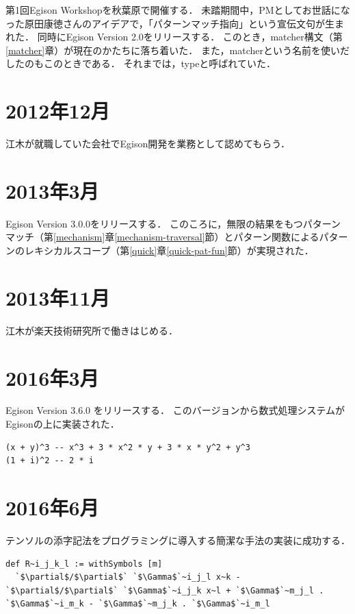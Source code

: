 第1回Egison Workshopを秋葉原で開催する．
未踏期間中，PMとしてお世話になった原田康徳さんのアイデアで，「パターンマッチ指向」という宣伝文句が生まれた．
同時にEgison Version 2.0をリリースする．
このとき，matcher構文（第\ref{matcher}章）が現在のかたちに落ち着いた．
また，matcherという名前を使いだしたのもこのときである．
それまでは，typeと呼ばれていた．

\section*{2012年12月}

江木が就職していた会社でEgison開発を業務として認めてもらう．

\section*{2013年3月}

Egison Version 3.0.0をリリースする．
このころに，無限の結果をもつパターンマッチ（第\ref{mechanism}章\ref{mechanism-traversal}節）とパターン関数によるパターンのレキシカルスコープ（第\ref{quick}章\ref{quick-pat-fun}節）が実現された．

\section*{2013年11月}

江木が楽天技術研究所で働きはじめる．

\section*{2016年3月}

Egison Version 3.6.0 をリリースする．
このバージョンから数式処理システムがEgisonの上に実装された．
\begin{lstlisting}[language=egison,numbers=none]
(x + y)^3 -- x^3 + 3 * x^2 * y + 3 * x * y^2 + y^3
(1 + i)^2 -- 2 * i
\end{lstlisting}

\section*{2016年6月}

テンソルの添字記法をプログラミングに導入する簡潔な手法の実装に成功する．
\begin{lstlisting}[language=egison,numbers=none]
def R~i_j_k_l := withSymbols [m]
  `$\partial$/$\partial$` `$\Gamma$`~i_j_l x~k - `$\partial$/$\partial$` `$\Gamma$`~i_j_k x~l + `$\Gamma$`~m_j_l . `$\Gamma$`~i_m_k - `$\Gamma$`~m_j_k . `$\Gamma$`~i_m_l
\end{lstlisting}

